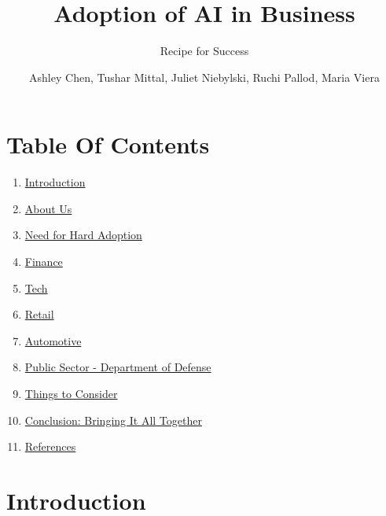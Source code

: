 \documentclass[
]{article}
\title{Adoption of AI in Business}
\subtitle{Recipe for Success}
\author{Ashley Chen, Tushar Mittal, Juliet Niebylski, Ruchi Pallod, Maria Viera}
\date{}
\providecommand{\tightlist}{%
  \setlength{\itemsep}{0pt}\setlength{\parskip}{0pt}}
\begin{document}
\maketitle

{
\setcounter{tocdepth}{2}
\tableofcontents
}
\hypertarget{table-of-contents}{%
\section*{Table Of Contents}\label{table-of-contents}}

\begin{enumerate}
\def\labelenumi{\arabic{enumi}.}
\tightlist
\item
  \href{https://tmittala.github.io/Recipe_for_Success/introduction.html}{Introduction}
\item
  \href{https://tmittala.github.io/Recipe_for_Success/about-us.html}{About Us}
\item
  \href{https://tmittala.github.io/Recipe_for_Success/need-for-hard-adoption.html}{Need for Hard Adoption}
\item
  \href{https://tmittala.github.io/Recipe_for_Success/finance.html}{Finance}
\item
  \href{https://tmittala.github.io/Recipe_for_Success/tech.html}{Tech}
\item
  \href{https://tmittala.github.io/Recipe_for_Success/retail.html}{Retail}
\item
  \href{https://tmittala.github.io/Recipe_for_Success/automotive.html}{Automotive}
\item
  \href{https://tmittala.github.io/Recipe_for_Success/public-sector---department-of-defense.html}{Public Sector - Department of Defense}
\item
  \href{https://tmittala.github.io/Recipe_for_Success/things-to-consider.html}{Things to Consider}
\item
  \href{https://tmittala.github.io/Recipe_for_Success/conclusion-bringing-it-all-together.html}{Conclusion: Bringing It All Together}
\item
  \href{https://tmittala.github.io/Recipe_for_Success/references.html}{References}
\end{enumerate}

\hypertarget{introduction}{%
\section*{Introduction}\label{introduction}}
\end{document}
